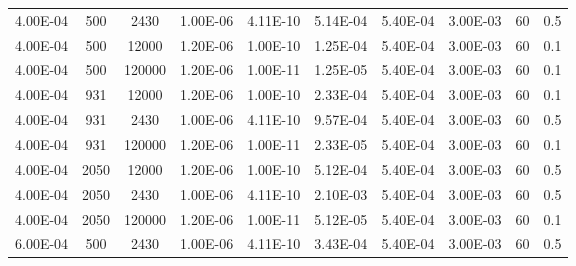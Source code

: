 \documentclass[../thesis.tex]{subfiles}
\begin{document}
\begin{landscape}
\begin{table}[htb]
\begin{tabular}{cccccccccc}
			4.00E-04            & 500         & 2430        & 1.00E-06               & 4.11E-10               & 5.14E-04              & 5.40E-04      & 3.00E-03        & 60                            & 0.5                       \\
			4.00E-04            & 500         & 12000       & 1.20E-06               & 1.00E-10               & 1.25E-04              & 5.40E-04      & 3.00E-03        & 60                            & 0.1                       \\
			4.00E-04            & 500         & 120000      & 1.20E-06               & 1.00E-11               & 1.25E-05              & 5.40E-04      & 3.00E-03        & 60                            & 0.1                       \\
			4.00E-04            & 931         & 12000       & 1.20E-06               & 1.00E-10               & 2.33E-04              & 5.40E-04      & 3.00E-03        & 60                            & 0.1                       \\
			4.00E-04            & 931         & 2430        & 1.00E-06               & 4.11E-10               & 9.57E-04              & 5.40E-04      & 3.00E-03        & 60                            & 0.5                       \\
			4.00E-04            & 931         & 120000      & 1.20E-06               & 1.00E-11               & 2.33E-05              & 5.40E-04      & 3.00E-03        & 60                            & 0.1                       \\
			4.00E-04            & 2050        & 12000       & 1.20E-06               & 1.00E-10               & 5.12E-04              & 5.40E-04      & 3.00E-03        & 60                            & 0.5                       \\
			4.00E-04            & 2050        & 2430        & 1.00E-06               & 4.11E-10               & 2.10E-03              & 5.40E-04      & 3.00E-03        & 60                            & 0.5                       \\
			4.00E-04            & 2050        & 120000      & 1.20E-06               & 1.00E-11               & 5.12E-05              & 5.40E-04      & 3.00E-03        & 60                            & 0.1                       \\
			6.00E-04            & 500         & 2430        & 1.00E-06               & 4.11E-10               & 3.43E-04              & 5.40E-04      & 3.00E-03        & 60                            & 0.5                       \\

\end{tabular}
\end{table}
\end{landscape}
\end{document}
